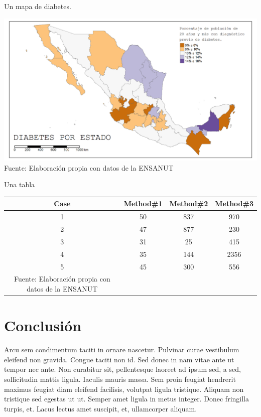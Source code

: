 \documentclass[12pt,spanish,a4paper,]{article}
\begin{document}
\begin{mapa}
  \caption{Un mapa de diabetes.}
  \includegraphics{images/estatal_diabetes.png}
  \footnotesize{Fuente: Elaboración propia con datos de la ENSANUT}
\end{mapa}

\begin{tabla}
  \caption{Una tabla} 
  \centering 
  \begin{tabular}{c c c c} 
  \hline\hline 
  Case & Method\#1 & Method\#2 & Method\#3 \\ 
  \hline 
  1 & 50 & 837 & 970 \\
  2 & 47 & 877 & 230 \\
  3 & 31 & 25 & 415 \\
  4 & 35 & 144 & 2356 \\
  5 & 45 & 300 & 556 \\ 
  \hline 
  \footnotesize{Fuente: Elaboración propia con datos de la ENSANUT}
  \end{tabular}
\end{tabla}

\newpage

\hypertarget{conclusiuxf3n}{%
\section{Conclusión}\label{conclusiuxf3n}}

Arcu sem condimentum taciti in ornare nascetur. Pulvinar curae vestibulum eleifend non gravida. Congue taciti non id. Sed donec in nam vitae ante ut tempor nec ante. Non curabitur sit, pellentesque laoreet ad ipsum sed, a sed, sollicitudin mattis ligula. Iaculis mauris massa. Sem proin feugiat hendrerit maximus feugiat diam eleifend facilisis, volutpat ligula tristique. Aliquam non tristique sed egestas ut ut. Semper amet ligula in metus integer. Donec fringilla turpis, et. Lacus lectus amet suscipit, et, ullamcorper aliquam.
\end{document}
